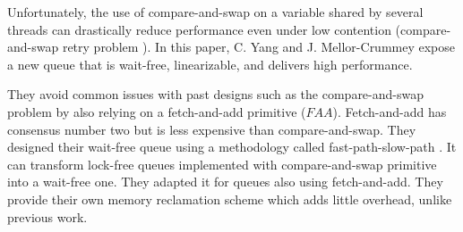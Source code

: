  Unfortunately, the use of compare-and-swap on a variable
shared by several threads can drastically reduce performance even under low
contention (compare-and-swap retry problem
\cite{Morrison:2013:FCQ:2517327.2442527}). In this paper, C. Yang and J.
Mellor-Crummey expose a new queue that is wait-free, linearizable, and delivers
high performance.

They avoid common issues with past designs such as the compare-and-swap problem
by also relying on a fetch-and-add primitive ($FAA$). Fetch-and-add has
consensus number two but is less expensive than compare-and-swap. They designed
their wait-free queue using a methodology called fast-path-slow-path
\cite{Kogan:2012:MCF:2370036.2145835}. It can transform lock-free queues
implemented with compare-and-swap primitive into a wait-free one. They adapted
it for queues also using fetch-and-add. They provide their own memory
reclamation scheme which adds little overhead, unlike previous work.
